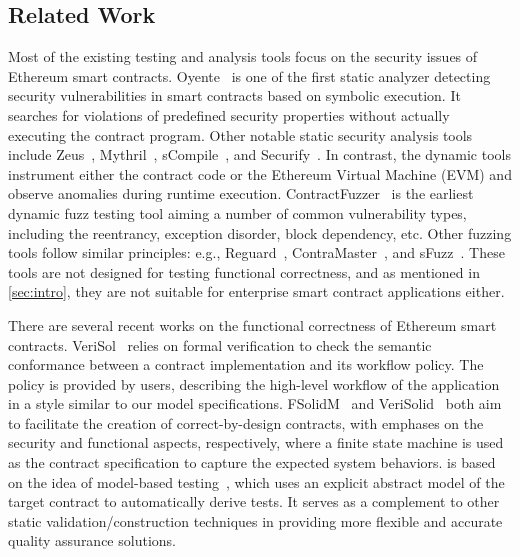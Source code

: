\subsection{Related Work}
\label{sec:related_work}

Most of the existing testing and analysis tools focus on the security issues of Ethereum smart
contracts.
Oyente~\cite{oyente,luu2016making} is one of the first static analyzer detecting security
vulnerabilities in smart contracts based on symbolic execution.
It searches for violations of predefined security properties without actually executing the
contract program.
Other notable static security analysis tools include Zeus~\cite{kalra2018zeus},
Mythril~\cite{mythril}, sCompile~\cite{chang2018scompile}, and Securify~\cite{tsankov2018securify}.
In contrast, the dynamic tools instrument either the contract code or the Ethereum Virtual Machine
(EVM) and observe anomalies during runtime execution.
ContractFuzzer~\cite{jiang2018contractfuzzer} is the earliest dynamic fuzz testing tool aiming a
number of common vulnerability types, including the reentrancy, exception disorder, block
dependency, etc.
Other fuzzing tools follow similar principles: e.g., Reguard~\cite{liu2018reguard},
ContraMaster~\cite{wang2019vultron,wang2019oracle}, and sFuzz~\cite{nguyen2020sfuzz}.
These tools are not designed for testing functional correctness, and as mentioned in \cref{sec:intro}, they are not suitable for enterprise smart contract applications
either.

There are several recent works on the functional correctness of Ethereum smart contracts.
VeriSol~\cite{born2020formal} relies on formal verification to check the semantic conformance
between a contract implementation and its workflow policy.
The policy is provided by users, describing the high-level workflow of the application in a style
similar to our model specifications.
FSolidM~\cite{mavridou2018designing} and VeriSolid~\cite{Mavridou2019} both aim to facilitate the
creation of correct-by-design contracts, with emphases on the security and functional aspects,
respectively, 
where a finite state machine is used as the contract specification to capture the expected system behaviors.
\modcon is based on the idea of model-based testing~\cite{utting2012taxonomy}, which uses an explicit
abstract model of the target contract to automatically derive tests.
It serves as a complement to other static validation/construction techniques in providing more
flexible and accurate quality assurance solutions.

